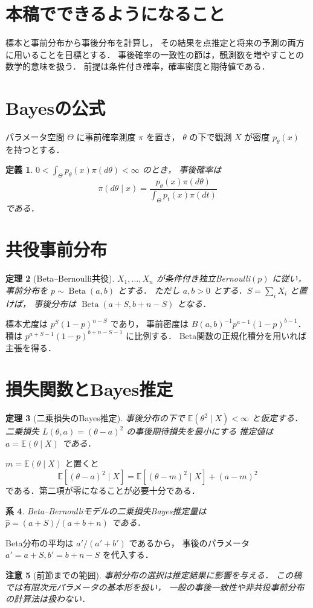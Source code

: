 \documentclass[a5paper,10pt,onecolumn]{jsarticle}
\makeatletter
\theoremstyle{mathnotetheorem}
\newtheorem{theorem}{定理}[section]
\newtheorem{definition}[theorem]{定義}
\newtheorem{corollary}[theorem]{系}
\newtheorem{remark}[theorem]{注意}
\renewcommand{\proofname}{証明}
\renewenvironment{proof}[1][\proofname]{%
  \par\pushQED{\qed}\normalfont\topsep4\p@\@plus2\p@\relax
  \trivlist\item[\hskip\labelsep\bfseries #1]\ignorespaces
}{\popQED\endtrivlist\@endpefalse}
\makeatother
\begin{document}
\section*{本稿でできるようになること}
標本と事前分布から事後分布を計算し，
その結果を点推定と将来の予測の両方に用いることを目標とする．
事後確率の一致性の節は，観測数を増やすことの数学的意味を扱う．
前提は条件付き確率，確率密度と期待値である．

\section{Bayesの公式}
パラメータ空間 $\Theta$ に事前確率測度 $\pi$ を置き，
$\theta$ の下で観測 $X$ が密度 $p_\theta(x)$ を持つとする．
\begin{definition}
$0<\int_\Theta p_\theta(x)\pi(d\theta)<\infty$ のとき，
事後確率は
\[
 \pi(d\theta\mid x)=
 \frac{p_\theta(x)\pi(d\theta)}{\int_\Theta p_t(x)\pi(dt)}
\]
である．
\end{definition}
\section{共役事前分布}
\begin{theorem}[Beta--Bernoulli共役]
$X_1,\ldots,X_n$ が条件付き独立Bernoulli$(p)$ に従い，
事前分布を $p\sim\operatorname{Beta}(a,b)$ とする．
ただし $a,b>0$ とする．$S=\sum_iX_i$ と置けば，
事後分布は $\operatorname{Beta}(a+S,b+n-S)$ となる．
\end{theorem}
\begin{proof}
標本尤度は $p^S(1-p)^{n-S}$ であり，
事前密度は $B(a,b)^{-1}p^{a-1}(1-p)^{b-1}$．
積は $p^{a+S-1}(1-p)^{b+n-S-1}$ に比例する．
Beta関数の正規化積分を用いれば主張を得る．
\end{proof}
\section{損失関数とBayes推定}
\begin{theorem}[二乗損失のBayes推定]
事後分布の下で $\mathbb E(\theta^2\mid X)<\infty$ と仮定する．
二乗損失 $L(\theta,a)=(\theta-a)^2$ の事後期待損失を最小にする
推定値は $a=\mathbb E(\theta\mid X)$ である．
\end{theorem}
\begin{proof}
$m=\mathbb E(\theta\mid X)$ と置くと
\[
 \mathbb E[(\theta-a)^2\mid X]
 =\mathbb E[(\theta-m)^2\mid X]+(a-m)^2
\]
である．第二項が零になることが必要十分である．
\end{proof}
\begin{corollary}
Beta--Bernoulliモデルの二乗損失Bayes推定量は
$\widehat p=(a+S)/(a+b+n)$ である．
\end{corollary}
\begin{proof}
Beta分布の平均は $a'/(a'+b')$ であるから，
事後のパラメータ $a'=a+S,b'=b+n-S$ を代入する．
\end{proof}
\begin{remark}[前節までの範囲]
事前分布の選択は推定結果に影響を与える．
この稿では有限次元パラメータの基本形を扱い，
一般の事後一致性や非共役事前分布の計算法は扱わない．
\end{remark}
\end{document}
